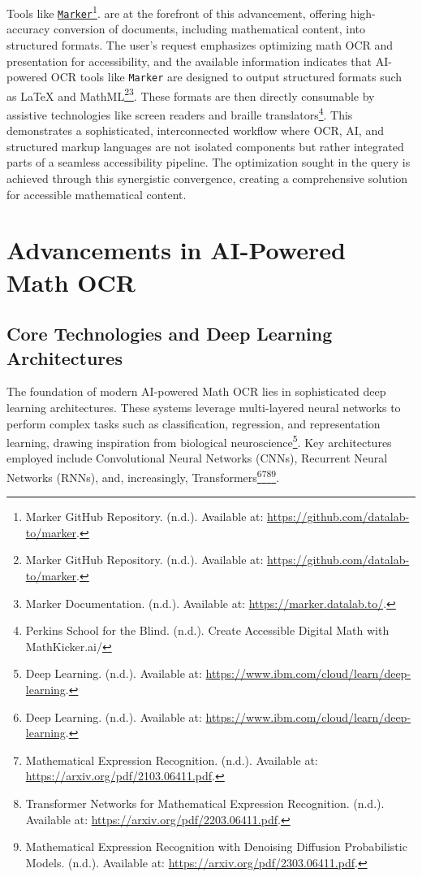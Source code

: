 Tools like \href{https://github.com/datalab-to/marker}{\texttt{Marker}}\footnote{Marker GitHub Repository. (n.d.). Available at: \url{https://github.com/datalab-to/marker}.}. are at the forefront of this advancement, offering high-accuracy conversion of documents, including mathematical content, into structured formats. The user's request emphasizes optimizing math OCR and presentation for accessibility, and the available information indicates that AI-powered OCR tools like \texttt{Marker} are designed to output structured formats such as LaTeX and MathML\footnote{Marker GitHub Repository. (n.d.). Available at: \url{https://github.com/datalab-to/marker}.}\footnote{Marker Documentation. (n.d.). Available at: \url{https://marker.datalab.to/}.}. These formats are then directly consumable by assistive technologies like screen readers and braille translators\footnote{Perkins School for the Blind. (n.d.). Create Accessible Digital Math with MathKicker.ai/}. This demonstrates a sophisticated, interconnected workflow where OCR, AI, and structured markup languages are not isolated components but rather integrated parts of a seamless accessibility pipeline. The optimization sought in the query is achieved through this synergistic convergence, creating a comprehensive solution for accessible mathematical content.

\section{Advancements in AI-Powered Math OCR}\label{sec:ai-math-ocr}
\subsection{Core Technologies and Deep Learning Architectures}
The foundation of modern AI-powered Math OCR lies in sophisticated deep learning architectures. These systems leverage multi-layered neural networks to perform complex tasks such as classification, regression, and representation learning, drawing inspiration from biological neuroscience\footnote{Deep Learning. (n.d.). Available at: \url{https://www.ibm.com/cloud/learn/deep-learning}.}. Key architectures employed include Convolutional Neural Networks (CNNs), Recurrent Neural Networks (RNNs), and, increasingly, Transformers\footnote{Deep Learning. (n.d.). Available at: \url{https://www.ibm.com/cloud/learn/deep-learning}.}\footnote{Mathematical Expression Recognition. (n.d.). Available at: \url{https://arxiv.org/pdf/2103.06411.pdf}.}\footnote{Transformer Networks for Mathematical Expression Recognition. (n.d.). Available at: \url{https://arxiv.org/pdf/2203.06411.pdf}.}\footnote{Mathematical Expression Recognition with Denoising Diffusion Probabilistic Models. (n.d.). Available at: \url{https://arxiv.org/pdf/2303.06411.pdf}.}.

